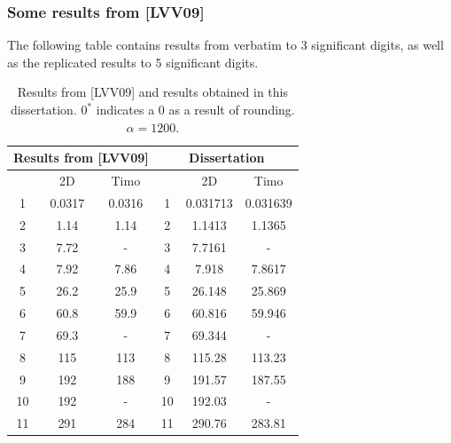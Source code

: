 \documentclass[../../main.tex]{subfiles}
\begin{document}
\subsubsection{Some results from [LVV09]}
The following table contains results from \cite{LVV09} verbatim to 3 significant digits, as well as the replicated results to 5 significant digits.



\begin{table}[!ht]
	\centering
	\caption{Results from [LVV09] and results obtained in this dissertation. $0^*$ indicates a 0 as a result of rounding. $\alpha = 1200$.}
	\begin{tabular}{|c|c|c||c|c|c|}
		\hline
		\multicolumn{3}{|c||}{Results from [LVV09]} & \multicolumn{3}{c|}{Dissertation} \\ \hline \hline
		~ & 2D & Timo & ~ & 2D & Timo  \\ \hline
		1 & 0.0317 & 0.0316 & 1 & 0.031713 & 0.031639  \\ 
		2 & 1.14 & 1.14  & 2 & 1.1413 & 1.1365  \\ 
		3 & 7.72 & - & 3 & 7.7161 & - \\ 
		4 & 7.92 & 7.86 &  4 & 7.918 & 7.8617    \\ 
		5 & 26.2 & 25.9 & 5 & 26.148 & 25.869   \\ 
		6 & 60.8 & 59.9 & 6 & 60.816 & 59.946  \\ 
		7 & 69.3 & - & 7 & 69.344 & -  \\ 
		8 & 115 & 113 &  8 & 115.28 & 113.23   \\ 
		9 & 192 & 188 &  9 & 191.57 & 187.55   \\ 
		10 & 192 & - & 10 & 192.03 & -  \\ 
		11 & 291 & 284 & 11 & 290.76 & 283.81   \\ \hline
	\end{tabular}\label{Results_LVV09}
\end{table}
\end{document}
